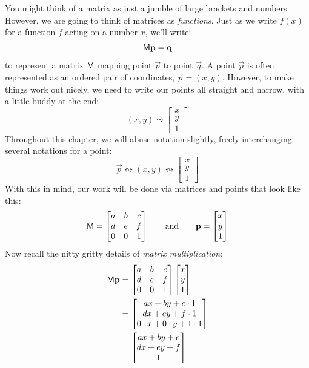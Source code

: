 You might think of a matrix as just a jumble of large brackets and
numbers. However, we are going to think of matrices as
\textit{functions}. Just as we write $f(x)$ for a function $f$ acting
on a number $x$, we'll write:
\[
\mathsf{M} \mathbf{p} = \mathbf{q} 
\]
to represent a matrix $\mathsf{M}$ mapping point $\vec{p}$ to point
$\vec{q}$. A point $\vec p$ is often represented as an ordered pair of
coordinates, $\vec{p} = (x,y)$. However, to make things work out
nicely, we need to write our points all straight and narrow, with a
little buddy at the end:
\[
(x,y) \leadsto \begin{bmatrix} 
x \\ 
y \\
1
\end{bmatrix}
\]
Throughout this chapter, we will abuse notation slightly, freely
interchanging several notations for a point:
\[
\vec{p} \leftrightsquigarrow
(x,y) \leftrightsquigarrow
\begin{bmatrix} 
x \\ 
y \\
1
\end{bmatrix}
\]
With this in mind, our work will be done via matrices and
points that look like this:
\[
\mathsf{M} = 
\begin{bmatrix}
a & b & c \\ 
d & e & f \\
0 & 0 & 1
\end{bmatrix}\qquad\text{and}\qquad \mathbf{p} = 
\begin{bmatrix}
x \\
y \\
1
\end{bmatrix}
\]
Now recall the nitty gritty details of \textit{matrix
  multiplication}:
\begin{align*}
\mathsf{M} \mathbf{p} &= 
\begin{bmatrix}
a & b & c \\ 
d & e & f \\
0 & 0 & 1
\end{bmatrix}
\begin{bmatrix}
x \\
y \\
1
\end{bmatrix} \\
&= \begin{bmatrix}
ax + by + c\cdot 1\\
dx + ey + f\cdot 1\\
0\cdot x + 0 \cdot y  + 1\cdot 1
\end{bmatrix}\\
&= \begin{bmatrix}
ax + by + c\\ 
dx + ey + f\\
1
\end{bmatrix}
\end{align*}

